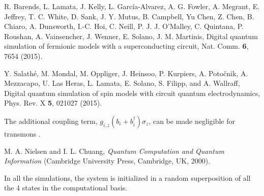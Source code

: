 \documentclass[aps,twocolumn,groupedaddress,superscriptaddress,floatfix,amsmath,amssymb,prb]{revtex4-1}
\begin{document}
\begin{thebibliography}{99}
R. Barends, L. Lamata, J. Kelly, L. Garc\'{i}a-Alvarez, A. G. Fowler, A. Megrant, E. Jeffrey, T. C. White, D. Sank, J. Y. Mutus, 
B. Campbell, Yu Chen, Z. Chen, B. Chiaro, A. Dunsworth, I.-C. Hoi, C. Neill, P. J. J. O'Malley, C. Quintana, P. Roushan, A. Vainsencher, 
J. Wenner, E. Solano, J. M. Martinis,
{Digital quantum simulation of fermionic models with a superconducting circuit},
Nat. Comm. {\bf 6}, 7654 (2015).

Y. Salath\'{e}, M. Mondal, M. Oppliger, J. Heinsoo, P. Kurpiers, A. Poto\v{c}nik, A. Mezzacapo, U. Las Heras, L. Lamata, E. Solano, S. Filipp, and A. Wallraff, 
{Digital quantum simulation of spin models with circuit quantum electrodynamics}, 
Phys. Rev. X {\bf 5}, 021027 (2015).


The additional coupling term, $g_{i,z} \left(b_i+b_i^\dagger\right)\sigma_z$, can be made negligible for transmons \cite{Sillanpaa2013}.



M. A. Nielsen and I. L. Chuang, 
\textit{Quantum Computation and Quantum Information} (Cambridge University Press, Cambridge, UK, 2000).

In all the simulations, the system is initialized in a random superposition of all the 4 states in the computational basis.

	

\end{thebibliography}
\end{document}
